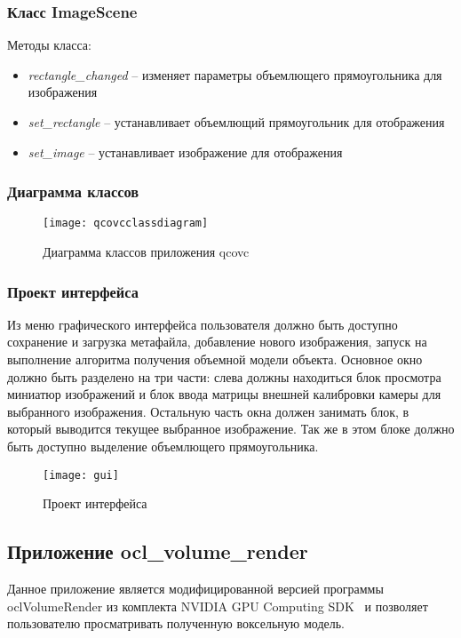\subsubsection{Класс ImageScene}
Методы класса:
\begin{itemize}
\item \textit{rectangle\_changed} -- изменяет параметры объемлющего прямоугольника для изображения
\item \textit{set\_rectangle} -- устанавливает объемлющий прямоугольник для отображения
\item \textit{set\_image} -- устанавливает изображение для отображения
\end{itemize}

\subsubsection{Диаграмма классов}
\begin{figure}[h]
\center
\texttt{[image: qcovcclassdiagram]}
\caption{Диаграмма классов приложения qcovc}
\end{figure}

\subsubsection{Проект интерфейса}
Из меню графического интерфейса пользователя должно быть доступно сохранение и загрузка метафайла, добавление нового изображения, запуск на выполнение алгоритма получения объемной модели объекта. Основное окно должно быть разделено на три части: слева должны находиться блок просмотра миниатюр изображений и блок ввода матрицы внешней калибровки камеры для выбранного изображения. Остальную часть окна должен занимать блок, в который выводится текущее выбранное изображение. Так же в этом блоке должно быть доступно выделение объемлющего прямоугольника.
\begin{figure}[h]
\center
\texttt{[image: gui]}
\caption{Проект интерфейса}
\end{figure}

\newpage
\subsection{Приложение ocl\_volume\_render}
Данное приложение является модифицированной версией программы oclVolumeRender из комплекта NVIDIA GPU Computing SDK~\cite{nvidia_gpu_sdk} и позволяет пользователю просматривать полученную воксельную модель.


